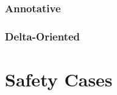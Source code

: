 \documentclass[11pt]{article}
\begin{document}
\subsubsection{Annotative}
%
%
\subsubsection{Delta-Oriented}
%
%
\section{Safety Cases}
\end{document}
